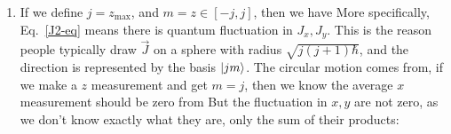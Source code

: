 \documentclass{school-22.101-notes}
\begin{document}
\begin{enumerate}
\begin{enumerate}
  \item If we define $j = z_{\max}$, and $m = z \in [-j, j]$, then we have 
    More specifically, 
    Eq.~\ref{J2-eq} means there is quantum fluctuation in $J_x, J_y$. This is the reason people typically draw $\vec{J}$ on a sphere with radius $\sqrt{j(j+1) \hbar}$, and the direction is represented by the basis $\left| jm \right>$. The circular motion comes from, if we make a $z$ measurement and get $m=j$, then we know the average $x$ measurement should be zero from 
        But the fluctuation in $x,y$ are not zero, as we don't know exactly what they are, only the sum of their products: 
  \end{enumerate}
\end{enumerate}
\end{document}

